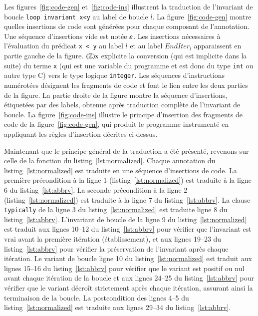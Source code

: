 Les figures~\ref{fig:code-gen} et~\ref{fig:code-ins} illustrent la traduction
de l'invariant de boucle \lstinline'loop invariant x<y' au label de boucle $l$.
La figure~\ref{fig:code-gen} montre quelles insertions de code sont générées
pour chaque composant de l'annotation.
Une séquence d'insertions vide est notée $\varepsilon$.
Les insertions nécessaires à l'évaluation du prédicat \lstinline'x < y' au
label $l$ et au label $\mathit{EndIter_l}$ apparaissent en partie gauche de la
figure.
$(\mathbb{Z})\mbox{\lstinline'x'}$ explicite la conversion (qui est implicite
dans la suite) du terme \lstinline'x' (qui est une variable du programme et est
donc du type \lstinline'int' ou autre type C) vers le type logique
\lstinline'integer'.
Les séquences d'instructions numérotées
 désignent les fragments de
code et font le lien entre les deux parties de la figure.
La partie droite de la figure montre la séquence d'insertions, étiquetées par
des labels, obtenue après traduction complète de l'invariant de boucle.
La figure~\ref{fig:code-ins} illustre le principe d'insertion des fragments de
code de la figure~\ref{fig:code-gen}, qui produit le programme instrumenté en
appliquant les règles d'insertion décrites ci-dessus.

Maintenant que le principe général de la traduction a été présenté, revenons
sur celle de la fonction du listing~\ref{lst:normalized}.
Chaque annotation du listing~\ref{lst:normalized} est traduite en une séquence
d'insertions de code.
La première précondition à la ligne 1 (listing~\ref{lst:normalized}) est
traduite à la ligne 6 du listing~\ref{lst:abbrv}.
La seconde précondition à la ligne 2 (listing~\ref{lst:normalized}) est
traduite à la ligne 7 du listing~\ref{lst:abbrv}.
La clause \lstinline'typically' de la ligne 3 du listing~\ref{lst:normalized}
est traduite ligne 8 du listing~\ref{lst:abbrv}.
L'invariant de boucle de la ligne 9 du listing~\ref{lst:normalized} est traduit
aux lignes 10--12 du listing~\ref{lst:abbrv} pour vérifier que l'invariant est
vrai avant la première itération (établissement), et aux lignes 19--23 du
listing~\ref{lst:abbrv} pour vérifier la préservation de l'invariant après
chaque itération.
Le variant de boucle ligne 10 du listing~\ref{lst:normalized} est traduit aux
lignes 15--16 du listing~\ref{lst:abbrv} pour vérifier que le variant est
positif ou nul avant chaque itération de la boucle et aux lignes 24--25 du
listing~\ref{lst:abbrv} pour vérifier que le
variant décroît strictement après chaque itération, assurant ainsi la
terminaison de la boucle.
La postcondition des lignes 4--5 du listing~\ref{lst:normalized} est traduite
aux lignes 29--34 du listing~\ref{lst:abbrv}.


